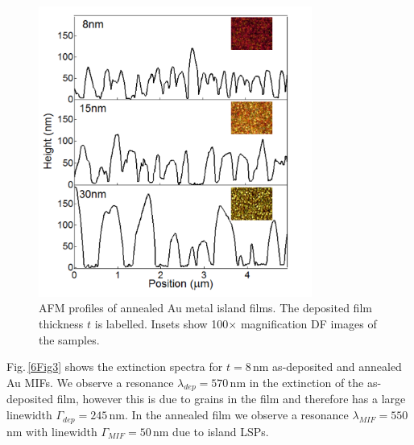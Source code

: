\begin{figure}[h!] 
\centering    
\includegraphics[width=0.8\textwidth]{Fig2}
\caption{AFM profiles of annealed Au metal island films. The deposited film thickness $t$ is labelled. Insets show 100$\times$ magnification DF images of the samples.}
\label{6Fig2}
\end{figure}

Fig.\,\ref{6Fig3} shows the extinction spectra for $t=8$\,nm as-deposited and annealed Au MIFs. We observe a resonance $\lambda_{dep} = 570$\,nm in the extinction of the as-deposited film, however this is due to grains in the film and therefore has a large linewidth $\Gamma_{dep} = 245$\,nm. In the annealed film we observe a resonance $\lambda_{MIF} = 550$\,nm with linewidth $\Gamma_{MIF} = 50$\,nm due to island LSPs.

